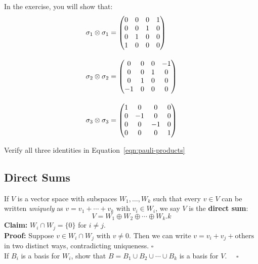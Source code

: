 \documentclass[12pt]{article}
\begin{document}
In the exercise, you will show that:
\begin{align}
\sigma_1 \otimes \sigma_1 &= 
\begin{pmatrix}0&0&0&1\\0&0&1&0\\0&1&0&0\\1&0&0&0\end{pmatrix} \notag \\[10pt]
\label{eqn:pauli-products}
\sigma_2 \otimes \sigma_2 &= 
\begin{pmatrix}0&0&0&-1\\0&0&1&0\\0&1&0&0\\-1&0&0&0\end{pmatrix} \\[10pt]
\sigma_3 \otimes \sigma_3 &= 
\begin{pmatrix}1&0&0&0\\0&-1&0&0\\0&0&-1&0\\0&0&0&1\end{pmatrix} \notag
\end{align}

\exercise Verify all three identities in Equation~\ref{eqn:pauli-products}



\subsection*{Direct Sums}

If $V$ is a vector space with subspaces $W_1, \ldots, W_k$ such that every
$v \in V$ can be written \emph{uniquely} as $v = v_1 + \cdots + v_k$ with
$v_i \in W_i$, we say $V$ is the \textbf{direct sum}:
\begin{equation*}
  V = W_1 \oplus W_2 \oplus \cdots \oplus W_k.
k\end{equation*}
\noindent\textbf{Claim:} $W_i \cap W_j = \{0\}$ for $i \neq j$.\\[3pt]
\noindent\textbf{Proof:} Suppose $v \in W_i \cap W_j$ with $v \neq 0$.  Then
we can write $v = v_i + v_j + \text{others}$ in two distinct ways, contradicting
uniqueness. $\square$\\[5pt]

\exercise If $B_i$ is a basis for $W_i$, show that $B = B_1 \cup
B_2 \cup \cdots \cup B_k$ is a basis for $V$. $\quad\square$\\[5pt]

\noindent
\end{document}
